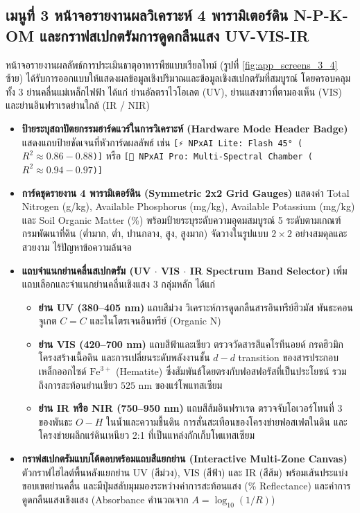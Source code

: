 \documentclass[12pt,a4paper,oneside]{book}
\begin{document}
\subsection{เมนูที่ 3 หน้าจอรายงานผลวิเคราะห์ 4 พารามิเตอร์ดิน N-P-K-OM และกราฟสเปกตรัมการดูดกลืนแสง UV-VIS-IR}
หน้าจอรายงานผลลัพธ์การประเมินธาตุอาหารพืชแบบเรียลไทม์ (รูปที่ \ref{fig:app_screens_3_4} ซ้าย) ได้รับการออกแบบให้แสดงผลข้อมูลเชิงปริมาณและข้อมูลเชิงสเปกตรัมที่สมบูรณ์ โดยครอบคลุมทั้ง 3 ย่านคลื่นแม่เหล็กไฟฟ้า ได้แก่ ย่านอัลตราไวโอเลต (UV), ย่านแสงขาวที่ตามองเห็น (VIS) และย่านอินฟราเรดย่านใกล้ (IR / NIR)
\begin{itemize}
    \item \textbf{ป้ายระบุสถาปัตยกรรมฮาร์ดแวร์ในการวิเคราะห์ (Hardware Mode Header Badge)} แสดงแถบป้ายชัดเจนที่หัวการ์ดผลลัพธ์ เช่น \texttt{[⚡ NPxAI Lite: Flash 45° ($R^2 \approx 0.86-0.88$)]} หรือ \texttt{[🔬 NPxAI Pro: Multi-Spectral Chamber ($R^2 \approx 0.94-0.97$)]}
    \item \textbf{การ์ดชุดรายงาน 4 พารามิเตอร์ดิน (Symmetric 2x2 Grid Gauges)} แสดงค่า Total Nitrogen (g/kg), Available Phosphorus (mg/kg), Available Potassium (mg/kg) และ Soil Organic Matter (\%) พร้อมป้ายระบุระดับความอุดมสมบูรณ์ 5 ระดับตามเกณฑ์กรมพัฒนาที่ดิน (ต่ำมาก, ต่ำ, ปานกลาง, สูง, สูงมาก) จัดวางในรูปแบบ $2 \times 2$ อย่างสมดุลและสวยงาม ไร้ปัญหาข้อความล้นจอ
    \item \textbf{แถบจำแนกย่านคลื่นสเปกตรัม (UV $\cdot$ VIS $\cdot$ IR Spectrum Band Selector)} เพิ่มแถบเลือกและจำแนกย่านคลื่นเชิงแสง 3 กลุ่มหลัก ได้แก่
    \begin{itemize}
        \item \textbf{ย่าน UV (380--405 nm)} แถบสีม่วง วิเคราะห์การดูดกลืนสารอินทรีย์ฮิวมัส พันธะคอนจูเกต $C=C$ และไนโตรเจนอินทรีย์ (Organic N)
        \item \textbf{ย่าน VIS (420--700 nm)} แถบสีฟ้าและเขียว ตรวจวัดสารสีแคโรทีนอยด์ กรดฮิวมิก โครงสร้างเนื้อดิน และการเปลี่ยนระดับพลังงานชั้น $d-d$ transition ของสารประกอบเหล็กออกไซด์ $\text{Fe}^{3+}$ (Hematite) ซึ่งสัมพันธ์โดยตรงกับฟอสฟอรัสที่เป็นประโยชน์ รวมถึงการสะท้อนย่านเขียว $525\text{ nm}$ ของแร่โพแทสเซียม
        \item \textbf{ย่าน IR หรือ NIR (750--950 nm)} แถบสีส้มอินฟราเรด ตรวจจับโอเวอร์โทนที่ 3 ของพันธะ $O-H$ ในน้ำและความชื้นดิน การสั่นสะเทือนของโครงข่ายฟอสเฟตในดิน และโครงข่ายผลึกแร่ดินเหนียว 2:1 ที่เป็นแหล่งกักเก็บโพแทสเซียม
    \end{itemize}
    \item \textbf{กราฟสเปกตรัมแบบโต้ตอบพร้อมแถบสีแยกย่าน (Interactive Multi-Zone Canvas)} ตัวกราฟไฮไลต์พื้นหลังแยกย่าน UV (สีม่วง), VIS (สีฟ้า) และ IR (สีส้ม) พร้อมเส้นประแบ่งขอบเขตย่านคลื่น และมีปุ่มสลับมุมมองระหว่างค่าการสะท้อนแสง (\% Reflectance) และค่าการดูดกลืนแสงเชิงแสง (Absorbance คำนวณจาก $A = \log_{10}(1/R)$)

\end{itemize}
\end{document}
